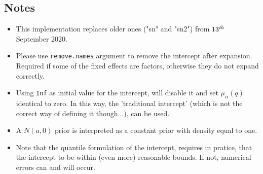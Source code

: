 \documentclass[a4paper,11pt]{article}
\begin{document}


\subsection*{Notes}

\begin{itemize}
\item This implementation replaces older ones ("sn" and "sn2") from
    $13^{\text{\emph{th}}}$ September 2020.
\item Please use \texttt{remove.names} argument to remove the
    intercept after expansion. Required if some of the fixed effects
    are factors, otherwise they do not expand correctly.
\item Using \texttt{Inf} as initial value for the intercept, will
    disable it and set $\mu_{\alpha}(q)$ identical to zero. In this
    way, the 'traditional intercept' (which is not the correct way of
    defining it though...), can be used.
\item A $N(a,0)$ prior is interpreted as a constant prior with density
    equal to one.
\item Note that the quantile formulation of the intercept, requires in
    pratice, that the intercept to be within (even more) reasonable
    bounds. If not, numerical errors can and will occur.
\end{itemize}
\end{document}
